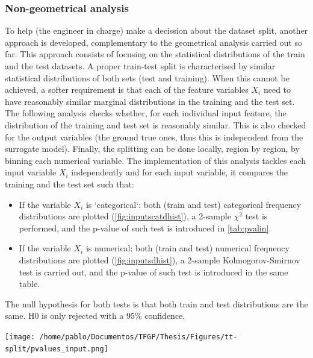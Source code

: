 \subsubsection{Non-geometrical analysis}
\indent To help (the engineer in charge) make a decission about the dataset split, another approach is developed, complementary to the geometrical analysis carried out so far. This approach consists of focusing on the statistical distributions of the train and the test datasets. A proper train-test split is characterised by similar statistical distributions of both sets (test and training)\cite{bonnasse2022interpolation}. When this cannot be achieved, a softer requirement is that each of the feature variables $X_i$ need to have reasonably similar marginal distributions in the training and the test set.\\
%
\indent The following analysis checks whether, for each individual input feature, the distribution of the training and test set is reasonably similar. This is also checked for the output variables (the ground true ones, thus this is independent from the surrogate model). Finally, the splitting can be done locally, \ie region by region, by binning each numerical variable. The implementation of this analysis tackles each input variable $X_i$ independently and for each input variable, it compares the training and the test set such that:\\
\begin{itemize}
	\item If the variable $X_i$ is `categorical`: both (train and test) categorical frequency distributions are plotted (\autoref{fig:inputscatdhist}), a 2-sample $\chi^2$ test\cite[p. 431]{velez1994calculo} is performed, and the p-value of such test is introduced in \autoref{tab:pvalin}.
	\item If the variable $X_i$ is numerical: both (train and test) numerical frequency distributions are plotted (\autoref{fig:inputsdhist}), a 2-sample Kolmogorov-Smirnov test\cite[p. 454]{velez1994calculo} is carried out, and the p-value of such test is introduced in the same table.
\end{itemize}
%
\indent The null hypothesis for both tests is that both train and test distributions are the same. H0 is only rejected with a 95\% confidence.\\
%
\begin{table}[!htb]
	\centering
	\label{tab:pvalin}
	\texttt{[image: /home/pablo/Documentos/TFGP/Thesis/Figures/tt-split/pvalues\_input.png]}
\end{table}
